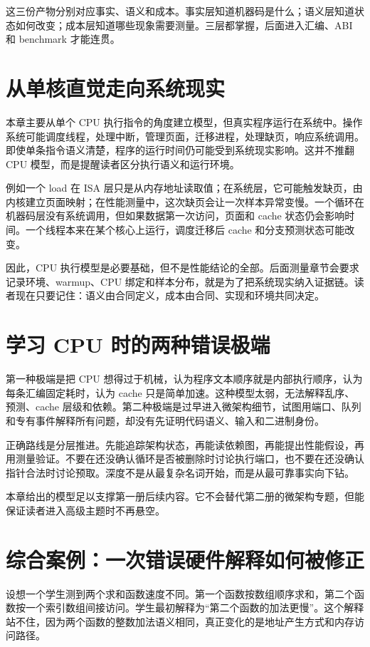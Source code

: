 这三份产物分别对应事实、语义和成本。事实层知道机器码是什么；语义层知道状态如何改变；成本层知道哪些现象需要测量。三层都掌握，后面进入汇编、ABI 和 benchmark 才能连贯。

\section{从单核直觉走向系统现实}

本章主要从单个 CPU 执行指令的角度建立模型，但真实程序运行在系统中。操作系统可能调度线程，处理中断，管理页面，迁移进程，处理缺页，响应系统调用。即使单条指令语义清楚，程序的运行时间仍可能受到系统现实影响。这并不推翻 CPU 模型，而是提醒读者区分执行语义和运行环境。

例如一个 load 在 ISA 层只是从内存地址读取值；在系统层，它可能触发缺页，由内核建立页面映射；在性能测量中，这次缺页会让一次样本异常变慢。一个循环在机器码层没有系统调用，但如果数据第一次访问，页面和 cache 状态仍会影响时间。一个线程本来在某个核心上运行，调度迁移后 cache 和分支预测状态可能改变。

因此，CPU 执行模型是必要基础，但不是性能结论的全部。后面测量章节会要求记录环境、warmup、CPU 绑定和样本分布，就是为了把系统现实纳入证据链。读者现在只要记住：语义由合同定义，成本由合同、实现和环境共同决定。

\section{学习 CPU 时的两种错误极端}

第一种极端是把 CPU 想得过于机械，认为程序文本顺序就是内部执行顺序，认为每条汇编固定耗时，认为 cache 只是简单加速。这种模型太弱，无法解释乱序、预测、cache 层级和依赖。第二种极端是过早进入微架构细节，试图用端口、队列和专有事件解释所有问题，却没有先证明代码语义、输入和二进制身份。

正确路线是分层推进。先能追踪架构状态，再能读依赖图，再能提出性能假设，再用测量验证。不要在还没确认循环是否被删除时讨论执行端口，也不要在还没确认指针合法时讨论预取。深度不是从最复杂名词开始，而是从最可靠事实向下钻。

本章给出的模型足以支撑第一册后续内容。它不会替代第二册的微架构专题，但能保证读者进入高级主题时不再悬空。

\section{综合案例：一次错误硬件解释如何被修正}

设想一个学生测到两个求和函数速度不同。第一个函数按数组顺序求和，第二个函数按一个索引数组间接访问。学生最初解释为“第二个函数的加法更慢”。这个解释站不住，因为两个函数的整数加法语义相同，真正变化的是地址产生方式和内存访问路径。

